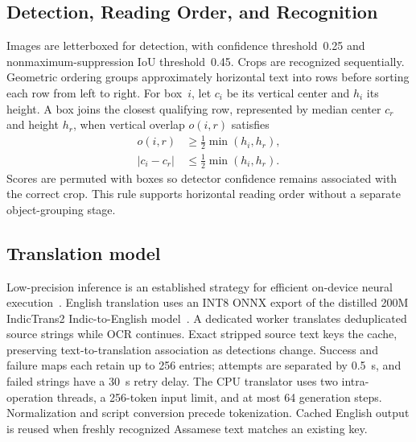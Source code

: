 \documentclass[cspaper,journal,10pt]{IEEEtran}
\begin{document}
\subsection{Detection, Reading Order, and Recognition}
Images are letterboxed for detection, with confidence threshold~0.25 and nonmaximum-suppression IoU threshold~0.45. Crops are recognized sequentially. Geometric ordering groups approximately horizontal text into rows before sorting each row from left to right. For box~$i$, let $c_i$ be its vertical center and $h_i$ its height. A box joins the closest qualifying row, represented by median center $c_r$ and height $h_r$, when vertical overlap $o(i,r)$ satisfies
\begin{align}
o(i,r)&\geq \tfrac12\min(h_i,h_r),\\
|c_i-c_r|&\leq \tfrac12\min(h_i,h_r).
\end{align}
Scores are permuted with boxes so detector confidence remains associated with the correct crop. This rule supports horizontal reading order without a separate object-grouping stage.

\subsection{Translation model}
Low-precision inference is an established strategy for efficient on-device neural execution~\cite{quantization}. English translation uses an INT8 ONNX export of the distilled 200M IndicTrans2 Indic-to-English model~\cite{indictrans2,export}. A dedicated worker translates deduplicated source strings while OCR continues. Exact stripped source text keys the cache, preserving text-to-translation association as detections change. Success and failure maps each retain up to 256 entries; attempts are separated by 0.5~s, and failed strings have a 30~s retry delay. The CPU translator uses two intra-operation threads, a 256-token input limit, and at most 64 generation steps. Normalization and script conversion precede tokenization. Cached English output is reused when freshly recognized Assamese text matches an existing key.
\end{document}
